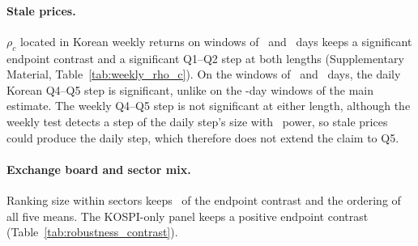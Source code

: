 \documentclass[a4paper,fleqn]{cas-sc}
\begin{document}
\paragraph{Stale prices.} $\rho_c$ located in Korean weekly returns on windows of \wkWindowShort\ and \wkWindowLong\ days keeps a significant endpoint contrast and a significant Q1--Q2 step at both lengths (Supplementary Material, Table~\ref{tab:weekly_rho_c}). On the windows of \wkWindowShort\ and \wkWindowLong\ days, the daily Korean Q4--Q5 step is significant, unlike on the \paperWindowDays-day windows of the main estimate. The weekly Q4--Q5 step is not significant at either length, although the weekly test detects a step of the daily step's size with \detectPowerPct\ power, so stale prices could produce the daily step, which therefore does not extend the claim to Q5.

\paragraph{Exchange board and sector mix.} Ranking size within sectors keeps \rhoCGapWithinSectorPctOfHeadline\ of the endpoint contrast and the ordering of all five means. The KOSPI-only panel keeps a positive endpoint contrast (Table~\ref{tab:robustness_contrast}).
\end{document}
